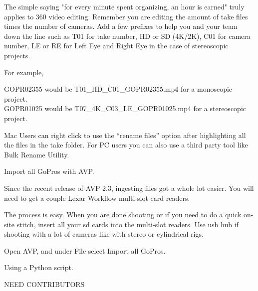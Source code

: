 \begin{fullwidth}
The simple saying "for every minute spent organizing, an hour is earned" truly applies to 360 video editing. Remember you are editing the amount of take files times the number of cameras. Add a few prefixes to help you and your team down the line such as T01 for take number, HD or SD (4K/2K), C01 for camera number, LE or RE for Left Eye and Right Eye in the case of stereoscopic projects.

For example,

GOPR02355 would be T01\_HD\_C01\_GOPR02355.mp4 for a monoscopic project.
\\
GOPR01025 would be T07\_4K\_C03\_LE\_GOPR01025.mp4 for a stereoscopic project.

\tip Mac Users can right click to use the “rename files” option after highlighting all the files in the take folder. For PC users you can also use a third party tool like Bulk Rename Utility.

{\large Import all GoPros with AVP. \par}

Since the recent release of AVP 2.3, ingesting files got a whole lot easier. You will need to get a couple Lexar Workflow multi-slot card readers. 

The process is easy. When you are done shooting or if you need to do a quick on-site stitch, insert all your sd cards into the multi-slot readers. Use usb hub if shooting with a lot of cameras like with stereo or cylindrical rigs.

Open AVP, and under File select Import all GoPros.


{\large Using a Python script. \par}

NEED CONTRIBUTORS

\clearpage
\end{fullwidth}
